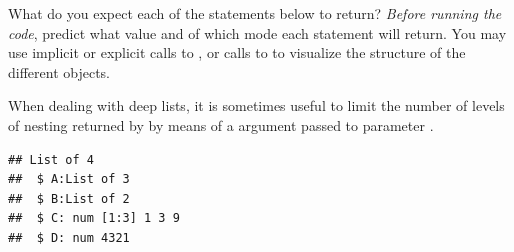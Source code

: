 \documentclass[krantz2]{krantz}\usepackage{knitr}
\begin{document}
\begin{playground}
What do you expect each of the statements below to return? \emph{Before running the code}, predict what value and of which mode each statement will return. You may use implicit or explicit calls to , or calls to  to visualize the structure of the different objects.

\begin{knitrout}\footnotesize
{}\color{fgcolor}\begin{kframe}
\begin{alltt}
 \hlkwb{<-} \hlstd{(} \hlstd{=} \hlstd{(}\hlstd{,} \hlstd{,} \hlstd{),}  \hlstd{=} \hlstd{(}\hlstd{,} \hlstd{))}
\hlstd{nested.list[}\hlopt{:}\hlstd{]}
\hlstd{nested.list[}\hlstd{]}
\hlstd{nested.list[[}\hlstd{]][}\hlstd{]}
\hlstd{nested.list[[}\hlstd{]][[}\hlstd{]]}
\hlstd{nested.list[}\hlstd{]}
\hlstd{nested.list[}\hlstd{][[}\hlstd{]]}
\end{alltt}
\end{kframe}
\end{knitrout}

\end{playground}

\begin{explainbox}
When dealing with deep lists, it is sometimes useful to limit the number of levels of nesting returned by  by means of a  argument passed to parameter .

\begin{knitrout}\footnotesize
{}\color{fgcolor}\begin{kframe}
\begin{alltt}
  \hlstd{=} \hlstd{)}
\end{alltt}
\begin{verbatim}
## List of 4
##  $ A:List of 3
##  $ B:List of 2
##  $ C: num [1:3] 1 3 9
##  $ D: num 4321
\end{verbatim}
\end{kframe}
\end{knitrout}

\end{explainbox}
\end{document}
